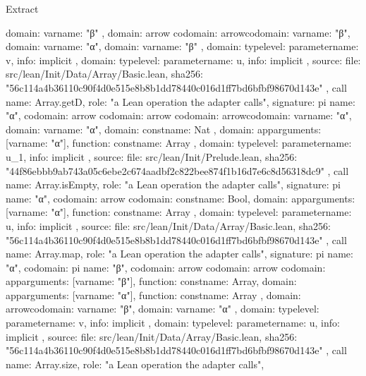 \begin{lexlean}{Extract}
\begin{toolingmodule}
{{{{{{              domain: var{name: "β"}
            },
            domain: arrow{
              codomain: arrow{codomain: var{name: "β"}, domain: var{name: "α"}},
              domain: var{name: "β"}
            }
          },
          domain: type{level: parameter{name: v}},
          info: implicit
        },
        domain: type{level: parameter{name: u}},
        info: implicit
      },
      source: {
        file: src/lean/Init/Data/Array/Basic.lean,
        sha256: "56c114a4b36110c90f4d0e515e8b8b1dd78440c016d1ff7bd6bfbf98670d143e"
      }
    },
    call{
      name: Array.getD,
      role: "a Lean operation the adapter calls",
      signature: pi{
        name: "α",
        codomain: arrow{
          codomain: arrow{
            codomain: arrow{codomain: var{name: "α"}, domain: var{name: "α"}},
            domain: const{name: Nat}
          },
          domain: app{arguments: [var{name: "α"}], function: const{name: Array}}
        },
        domain: type{level: parameter{name: u_1}},
        info: implicit
      },
      source: {
        file: src/lean/Init/Prelude.lean,
        sha256: "44f86ebbb9ab743a05c6ebe2c674aadbf2c822bee874f1b16d7e6c8d56318dc9"
      }
    },
    call{
      name: Array.isEmpty,
      role: "a Lean operation the adapter calls",
      signature: pi{
        name: "α",
        codomain: arrow{
          codomain: const{name: Bool},
          domain: app{arguments: [var{name: "α"}], function: const{name: Array}}
        },
        domain: type{level: parameter{name: u}},
        info: implicit
      },
      source: {
        file: src/lean/Init/Data/Array/Basic.lean,
        sha256: "56c114a4b36110c90f4d0e515e8b8b1dd78440c016d1ff7bd6bfbf98670d143e"
      }
    },
    call{
      name: Array.map,
      role: "a Lean operation the adapter calls",
      signature: pi{
        name: "α",
        codomain: pi{
          name: "β",
          codomain: arrow{
            codomain: arrow{
              codomain: app{arguments: [var{name: "β"}], function: const{name: Array}},
              domain: app{arguments: [var{name: "α"}], function: const{name: Array}}
            },
            domain: arrow{codomain: var{name: "β"}, domain: var{name: "α"}}
          },
          domain: type{level: parameter{name: v}},
          info: implicit
        },
        domain: type{level: parameter{name: u}},
        info: implicit
      },
      source: {
        file: src/lean/Init/Data/Array/Basic.lean,
        sha256: "56c114a4b36110c90f4d0e515e8b8b1dd78440c016d1ff7bd6bfbf98670d143e"
      }
    },
    call{
      name: Array.size,
      role: "a Lean operation the adapter calls",
}}
\end{toolingmodule}
\end{lexlean}
